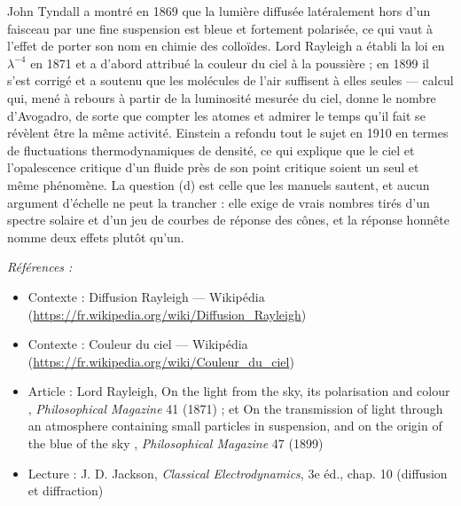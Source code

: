 \documentclass[11pt]{article}
\newenvironment{refs}{\par\small\noindent\emph{Références :}\begin{itemize}\setlength\itemsep{0pt}}{\end{itemize}\normalsize}
\begin{document}
\noindent John Tyndall a montré en 1869 que la lumière diffusée latéralement hors
d'un faisceau par une fine suspension est bleue et fortement polarisée, ce qui vaut à l'effet
de porter son nom en chimie des colloïdes. Lord Rayleigh a établi la loi en
$ \lambda^{-4} $ en 1871 et a d'abord attribué la couleur du ciel à la poussière ; en 1899
il s'est corrigé et a soutenu que les molécules de l'air suffisent à elles seules --- calcul
qui, mené à rebours à partir de la luminosité mesurée du ciel, donne le nombre d'Avogadro,
de sorte que compter les atomes et admirer le temps qu'il fait se révèlent être la même
activité. Einstein a refondu tout le sujet en 1910 en termes de fluctuations thermodynamiques
de densité, ce qui explique que le ciel et l'opalescence critique d'un fluide près de son
point critique soient un seul et même phénomène. La question (d) est celle que les manuels
sautent, et aucun argument d'échelle ne peut la trancher : elle exige de vrais nombres tirés
d'un spectre solaire et d'un jeu de courbes de réponse des cônes, et la réponse honnête
nomme deux effets plutôt qu'un.

\begin{refs}
\item Contexte : Diffusion Rayleigh --- Wikipédia (\url{https://fr.wikipedia.org/wiki/Diffusion_Rayleigh})
\item Contexte : Couleur du ciel --- Wikipédia (\url{https://fr.wikipedia.org/wiki/Couleur_du_ciel})
\item Article : Lord Rayleigh, \og{} On the light from the sky, its polarisation and colour \fg{}, \textit{Philosophical Magazine} 41 (1871) ; et \og{} On the transmission of light through an atmosphere containing small particles in suspension, and on the origin of the blue of the sky \fg{}, \textit{Philosophical Magazine} 47 (1899)
\item Lecture : J. D. Jackson, \textit{Classical Electrodynamics}, 3e éd., chap. 10 (diffusion et diffraction)
\end{refs}

\bigskip
\end{document}
